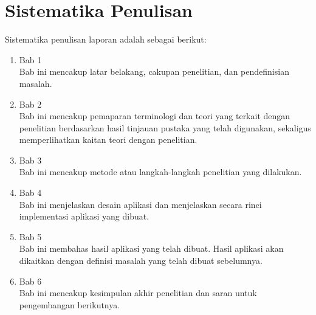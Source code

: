 \section{Sistematika Penulisan}
\label{sec:sistematikaPenulisan}
Sistematika penulisan laporan adalah sebagai berikut:
\begin{enumerate}
	\item Bab 1 \babSatu \\
	    Bab ini mencakup latar belakang, cakupan penelitian, dan pendefinisian masalah.
	\item Bab 2 \babDua \\
	    Bab ini mencakup pemaparan terminologi dan teori yang terkait dengan penelitian berdasarkan hasil tinjauan pustaka yang telah digunakan, sekaligus memperlihatkan kaitan teori dengan penelitian.
	\item Bab 3 \babTiga \\
	    Bab ini mencakup metode atau langkah-langkah penelitian yang dilakukan. 
	\item Bab 4 \babEmpat \\
		Bab ini menjelaskan desain aplikasi dan menjelaskan secara rinci implementasi aplikasi yang dibuat.
	\item Bab 5 \babLima \\
	    Bab ini membahas hasil aplikasi yang telah dibuat. Hasil aplikasi akan dikaitkan dengan definisi masalah yang telah dibuat sebelumnya.
	\item Bab 6 \kesimpulan \\
	    Bab ini mencakup kesimpulan akhir penelitian dan saran untuk pengembangan berikutnya.
\end{enumerate}
